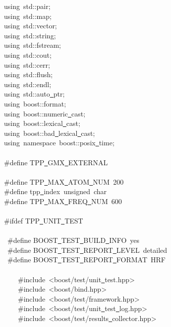 \documentclass[a4paper,10pt]{article}
\begin{document}
{\ttfamily \raggedright \small
using\ std::pair;\\
using\ std::map;\\
using\ std::vector;\\
using\ std::string;\\
using\ std::fstream;\\
using\ std::cout;\\
using\ std::cerr;\\
using\ std::flush;\\
using\ std::endl;\\
using\ std::auto\underline\ ptr;\\
using\ boost::format;\\
using\ boost::numeric\underline\ cast;\\
using\ boost::lexical\underline\ cast;\\
using\ boost::bad\underline\ lexical\underline\ cast;\\
using\ namespace\ boost::posix\underline\ time;\\
\ \\
\#define TPP\underline\ GMX\underline\ EXTERNAL\\
\ \\
\#define TPP\underline\ MAX\underline\ ATOM\underline\ NUM\ 200\\
\#define tpp\underline\ index\ unsigned\ char\\
\#define TPP\underline\ MAX\underline\ FREQ\underline\ NUM\ 600\\
\ \\
\#ifdef TPP\underline\ UNIT\underline\ TEST\\
\ \\
\ \#define BOOST\underline\ TEST\underline\ BUILD\underline\ INFO\ yes\\
\ \#define BOOST\underline\ TEST\underline\ REPORT\underline\ LEVEL\ detailed\\
\ \#define BOOST\underline\ TEST\underline\ REPORT\underline\ FORMAT\ HRF\\
\ \\
\ \ \ \ \#include\ <{}boost/test/unit\underline\ test.hpp>{}\\
\ \ \ \ \#include\ <{}boost/bind.hpp>{}\\
\ \ \ \ \#include\ <{}boost/test/framework.hpp>{}\\
\ \ \ \ \#include\ <{}boost/test/unit\underline\ test\underline\ log.hpp>{}\\
\ \ \ \ \#include\ <{}boost/test/results\underline\ collector.hpp>{}\\
}
\end{document}
